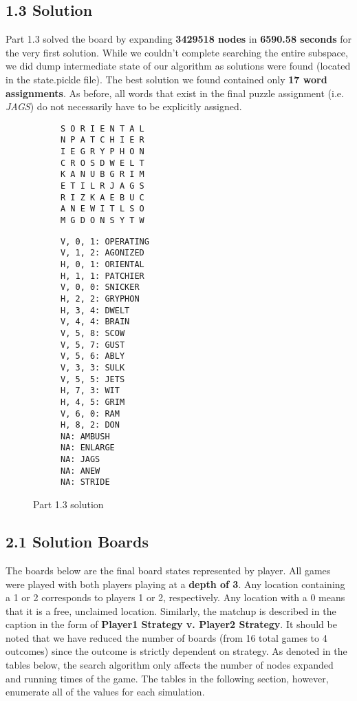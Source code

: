 \documentclass{article}
\begin{document}
\subsection{1.3 Solution}
Part 1.3 solved the board by expanding \textbf{3429518 nodes} in \textbf{6590.58 seconds} for the very first solution. While we couldn't complete searching the entire subspace, we did dump intermediate state of our algorithm as solutions were found (located in the state.pickle file). The best solution we found contained only \textbf{17 word assignments}. As before, all words that exist in the final puzzle assignment (i.e. \emph{JAGS}) do not necessarily have to be explicitly assigned.

\begin{figure}[H]
\centering
\begin{subfigure}{.5\textwidth}
\begin{verbatim}
S O R I E N T A L 
N P A T C H I E R 
I E G R Y P H O N 
C R O S D W E L T 
K A N U B G R I M 
E T I L R J A G S 
R I Z K A E B U C 
A N E W I T L S O 
M G D O N S Y T W
\end{verbatim}
\end{subfigure}%
\begin{subfigure}{.5\textwidth}
\begin{verbatim}
V, 0, 1: OPERATING
V, 1, 2: AGONIZED
H, 0, 1: ORIENTAL
H, 1, 1: PATCHIER
V, 0, 0: SNICKER
H, 2, 2: GRYPHON
H, 3, 4: DWELT
V, 4, 4: BRAIN
V, 5, 8: SCOW
V, 5, 7: GUST
V, 5, 6: ABLY
V, 3, 3: SULK
V, 5, 5: JETS
H, 7, 3: WIT
H, 4, 5: GRIM
V, 6, 0: RAM
H, 8, 2: DON
NA: AMBUSH
NA: ENLARGE
NA: JAGS
NA: ANEW
NA: STRIDE
\end{verbatim}
\end{subfigure}
\label{fig:board1.3}
\caption{Part 1.3 solution}
\end{figure}

\newpage

\subsection{2.1 Solution Boards}

The boards below are the final board states represented by player. All games were played with both players playing at a \textbf{depth of 3}. Any location containing a 1 or 2 corresponds to players 1 or 2, respectively. Any location with a 0 means that it is a free, unclaimed location. Similarly, the matchup is described in the caption in the form of \textbf{Player1 Strategy v. Player2 Strategy}. It should be noted that we have reduced the number of boards (from 16 total games to 4 outcomes) since the outcome is strictly dependent on strategy. As denoted in the tables below, the search algorithm only affects the number of nodes expanded and running times of the game. The tables in the following section, however, enumerate all of the values for each simulation.
\end{document}
